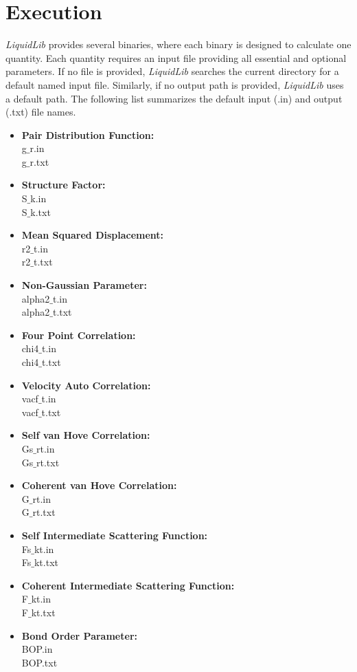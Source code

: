 \documentclass{article}
\begin{document}
\section{Execution}
\textit{LiquidLib} provides several binaries, where each binary is designed to calculate one quantity. Each quantity requires an input file providing all essential and optional parameters.  If no file is provided, \textit{LiquidLib} searches the current directory for a default named input file.  Similarly, if no output path is provided, \textit{LiquidLib} uses a default path.  The following list summarizes the default input (.in) and output (.txt) file names.
\begin{multicols}{2} \label{input_output}
\begin{itemize}
\item \textbf{Pair Distribution Function:}
 \\g$\_$r.in
 \\g$\_$r.txt
\item \textbf{Structure Factor:}
 \\S$\_$k.in
 \\S$\_$k.txt
\item \textbf{Mean Squared Displacement:}
 \\r2$\_$t.in
 \\r2$\_$t.txt
\item \textbf{Non-Gaussian Parameter:}
 \\alpha2$\_$t.in
 \\alpha2$\_$t.txt
 \item \textbf{Four Point Correlation:}
 \\chi4$\_$t.in
 \\chi4$\_$t.txt
 \item \textbf{Velocity Auto Correlation:}
 \\vacf$\_$t.in
 \\vacf$\_$t.txt
  \item \textbf{Self van Hove Correlation:}
 \\Gs$\_$rt.in
 \\Gs$\_$rt.txt
 \item \textbf{Coherent van Hove Correlation:}
 \\G$\_$rt.in
 \\G$\_$rt.txt
\item \textbf{Self Intermediate Scattering Function:}
 \\Fs$\_$kt.in
 \\Fs$\_$kt.txt
\item \textbf{Coherent Intermediate Scattering Function:}
\\F$\_$kt.in
\\F$\_$kt.txt
\item \textbf{Bond Order Parameter:}
\\BOP.in
\\BOP.txt
\end{itemize}
\end{multicols}
\end{document}
